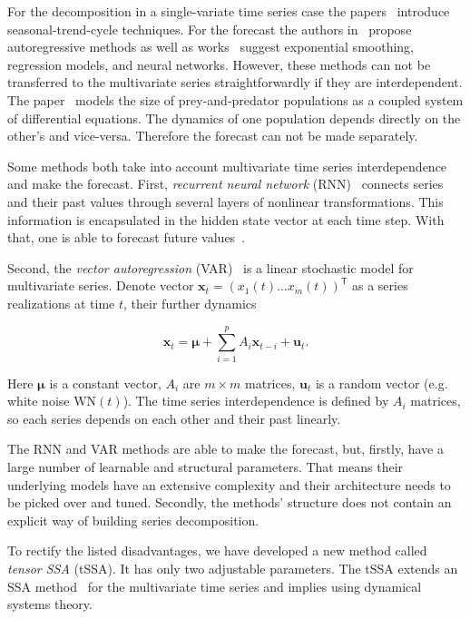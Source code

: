 \documentclass[referee, pdflatex, sn-mathphys-num]{sn-jnl}
\theoremstyle{definition}
\theoremstyle{plain}
\begin{document}
	For the decomposition in a single-variate time series case the papers~\cite{enders2010applied, x11, cleveland90} introduce seasonal-trend-cycle techniques. For the forecast the authors in~\cite{Box_Jenkins_methodology} propose autoregressive methods as well as works~\cite{3b1355aedd1041f1853e609a410576f3, enders2010applied} suggest exponential smoothing, regression models, and neural networks. However, these methods can not be transferred to the multivariate series straightforwardly if they are interdependent. The paper~\cite{Volterra:1928} models the size of prey-and-predator populations as a coupled system of differential equations. The dynamics of one population depends directly on the other's and vice-versa. Therefore the forecast can not be made separately. 
	
	Some methods both take into account multivariate time series interdependence and make the forecast. First, \emph{recurrent neural network} (RNN)~\cite{neco} connects series and their past values through several layers of nonlinear transformations. This information is encapsulated in the hidden state vector at each time step. With that, one is able to forecast future values~\cite{TEALAB2018334}.
	
	Second, the	\emph{vector autoregression} (VAR)~\cite{VAR_model1, doi:10.1080/01621459.1962.10480664} is a linear stochastic model for multivariate series. Denote vector $ \mathbf{x}_t = (x_1(t) \ldots x_m(t))^{\mathsf{T}} $ as a series realizations at time $ t $, their further dynamics
	
	\begin{equation*}
		\mathbf{x}_t = \boldsymbol{\mu} + \sum\limits_{i = 1}^p A_i \mathbf{x}_{t - i} + \mathbf{u}_t.
	\end{equation*}
	
	Here  $ \boldsymbol{\mu} $ is a constant vector, $ A_i $ are $ m \times m $ matrices, $ \mathbf{u}_t $ is a random vector (e.g. white noise $ \text{WN}(t) $). The time series interdependence is defined by $ A_i $ matrices, so each series depends on each other and their past linearly.
	
	The RNN and VAR methods are able to make the forecast, but, firstly, have a large number of learnable and structural parameters. That means their underlying models have an extensive complexity and their architecture needs to be picked over and tuned. Secondly, the methods' structure does not contain an explicit way of building series decomposition.
	
	To rectify the listed disadvantages, we have developed a new method called \emph{tensor SSA} (tSSA). It has only two adjustable parameters. The tSSA extends an SSA method~\cite{ecfb9dc578be43ae9ee8fc88b8ff9151} for the multivariate time series and implies using dynamical systems theory. 
	
\end{document}
